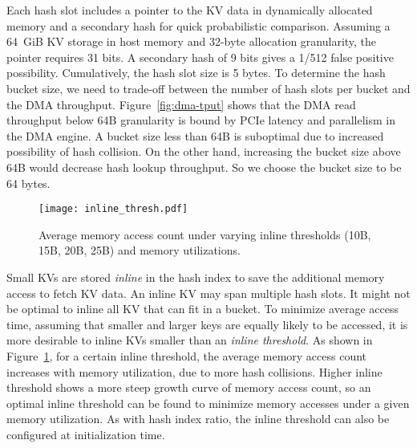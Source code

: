 
Each hash slot includes a pointer to the KV data in dynamically allocated memory and a secondary hash for quick probabilistic comparison.
Assuming a 64~GiB KV storage in host memory and 32-byte allocation granularity, the pointer requires 31 bits.
A secondary hash of 9 bits gives a 1/512 false positive possibility.
Cumulatively, the hash slot size is 5 bytes.
To determine the hash bucket size, we need to trade-off between the number of hash slots per bucket and the DMA throughput.
Figure~\ref{fig:dma-tput} shows that the DMA read throughput below 64B granularity is bound by PCIe latency and parallelism in the DMA engine.
A bucket size less than 64B is suboptimal due to increased possibility of hash collision.
On the other hand, increasing the bucket size above 64B would decrease hash lookup throughput.
So we choose the bucket size to be 64 bytes.

\begin{figure}[t]
\centering
\texttt{[image: inline\_thresh.pdf]}
\caption{Average memory access count under varying inline thresholds (10B, 15B, 20B, 25B) and memory utilizations.}
\label{fig:inline-offline}
\vspace{-10pt}
\end{figure}

Small KVs are stored \textit{inline} in the hash index to save the additional memory access to fetch KV data.
An inline KV may span multiple hash slots.
It might not be optimal to inline all KV that can fit in a bucket.
To minimize average access time, assuming that smaller and larger keys are equally likely to be accessed, it is more desirable to inline KVs smaller than an \textit{inline threshold}.
As shown in Figure~\ref{fig:inline-offline}, for a certain inline threshold, the average memory access count increases with memory utilization, due to more hash collisions.
Higher inline threshold shows a more steep growth curve of memory access count, so an optimal inline threshold can be found to minimize memory accesses under a given memory utilization.
As with hash index ratio, the inline threshold can also be configured at initialization time.

